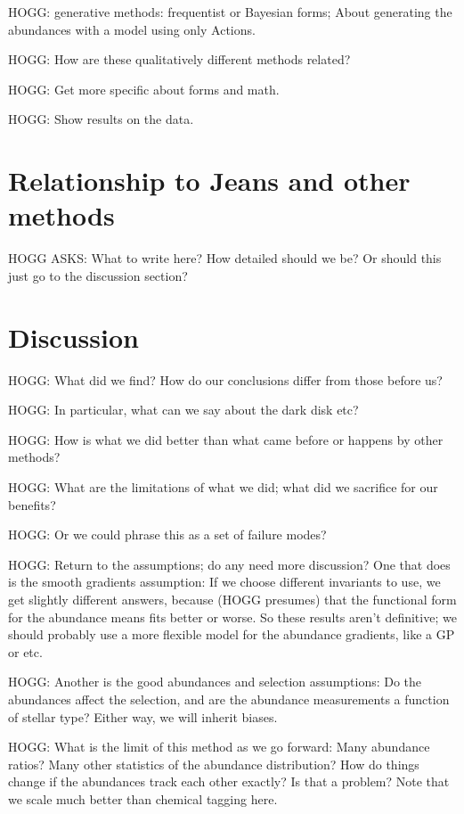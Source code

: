 \documentclass[modern]{aastex63}
\begin{document}
HOGG: generative methods: frequentist or Bayesian forms; About generating the abundances
with a model using only Actions.

HOGG: How are these qualitatively different methods related?

HOGG: Get more specific about forms and math.

HOGG: Show results on the data.

\section{Relationship to Jeans and other methods}

HOGG ASKS: What to write here? How detailed should we be? Or should this just
go to the discussion section?

\section{Discussion}

HOGG: What did we find? How do our conclusions differ from those before us?

HOGG: In particular, what can we say about the dark disk etc?

HOGG: How is what we did better than what came before or happens by other methods?

HOGG: What are the limitations of what we did; what did we sacrifice for our benefits?

HOGG: Or we could phrase this as a set of failure modes?

HOGG: Return to the assumptions; do any need more discussion? One that does is the smooth
gradients assumption: If we choose different invariants to use, we get slightly different
answers, because (HOGG presumes) that the functional form for the abundance means fits
better or worse. So these results aren't definitive; we should probably use a more flexible
model for the abundance gradients, like a GP or etc.

HOGG: Another is the good abundances and selection assumptions: Do the abundances affect
the selection, and are the abundance measurements a function of stellar type? Either way,
we will inherit biases.

HOGG: What is the limit of this method as we go forward: Many abundance ratios? Many other
statistics of the abundance distribution? How do things change if the abundances track
each other exactly? Is that a problem? Note that we scale much better than chemical tagging
here.
\end{document}
